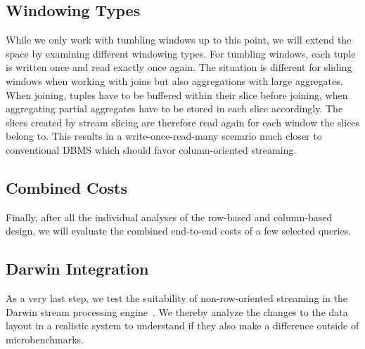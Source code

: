 \subsection{Windowing Types}

While we only work with tumbling windows up to this point, we will extend the space by examining different windowing types.
For tumbling windows, each tuple is written once and read exactly once again.
The situation is different for sliding windows when working with joins but also aggregations with large aggregates.
When joining, tuples have to be buffered within their slice before joining, when aggregating partial aggregates have to be stored in each slice accordingly.
The slices created by stream slicing are therefore read again for each window the slices belong to.
This results in a write-once-read-many scenario much closer to conventional DBMS which should favor column-oriented streaming.

\subsection{Combined Costs}

Finally, after all the individual analyses of the row-based and column-based design, we will evaluate the combined end-to-end costs of a few selected queries.

\subsection{Darwin Integration}

As a very last step, we test the suitability of non-row-oriented streaming in the Darwin stream processing engine~\cite[]{DBLP:conf/cidr/BensonR22}.
We thereby analyze the changes to the data layout in a realistic system to understand if they also make a difference outside of microbenchmarks.